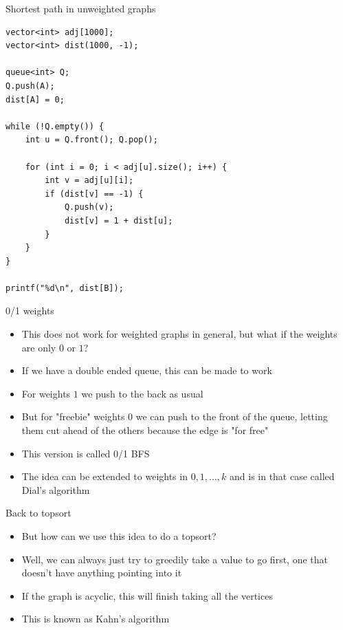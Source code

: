\documentclass{beamer}
\begin{document}
\begin{frame}{Shortest path in unweighted graphs}

    \begin{verbatim}
vector<int> adj[1000];
vector<int> dist(1000, -1);

queue<int> Q;
Q.push(A);
dist[A] = 0;

while (!Q.empty()) {
    int u = Q.front(); Q.pop();

    for (int i = 0; i < adj[u].size(); i++) {
        int v = adj[u][i];
        if (dist[v] == -1) {
            Q.push(v);
            dist[v] = 1 + dist[u];
        }
    }
}

printf("%d\n", dist[B]);
    \end{verbatim}

\end{frame}

\begin{frame}[plain]{0/1 weights}
    \vspace{5pt}
    \begin{itemize}
        \item This does not work for weighted graphs in general, but what if the weights are only $0$ or $1$?
        \item If we have a double ended queue, this can be made to work
        \item For weights $1$ we push to the back as usual
        \item But for "freebie" weights $0$ we can push to the front of the queue, letting them cut ahead of the others because the edge is "for free"
        \item This version is called 0/1 BFS
        \item The idea can be extended to weights in $0, 1, \dots, k$ and is in that case called Dial's algorithm
    \end{itemize}
\end{frame}

\begin{frame}[plain]{Back to topsort}
    \vspace{5pt}
    \begin{itemize}
        \item But how can we use this idea to do a topsort?
        \item Well, we can always just try to greedily take a value to go first, one that doesn't have anything pointing into it
        \item If the graph is acyclic, this will finish taking all the vertices
        \item This is known as Kahn's algorithm
    \end{itemize}
\end{frame}
\end{document}
